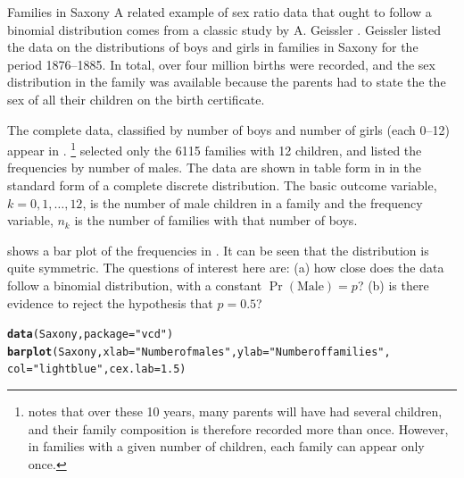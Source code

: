 \documentclass[11pt]{book}\usepackage[]{graphicx}\usepackage[]{color}
\makeatletter
\newcommand{\hlnum}[1]{\textcolor[rgb]{0.686,0.059,0.569}{#1}}%
\newcommand{\hlstr}[1]{\textcolor[rgb]{0.192,0.494,0.8}{#1}}%
\newcommand{\hlstd}[1]{\textcolor[rgb]{0.345,0.345,0.345}{#1}}%
\newcommand{\hlkwc}[1]{\textcolor[rgb]{0.333,0.667,0.333}{#1}}%
\newcommand{\hlkwd}[1]{\textcolor[rgb]{0.737,0.353,0.396}{\textbf{#1}}}%
\newenvironment{kframe}{%
 \def\at@end@of@kframe{}%
 \ifinner\ifhmode%
  \def\at@end@of@kframe{\end{minipage}}%
  \begin{minipage}{\columnwidth}%
 \fi\fi%
 \def\FrameCommand##1{\hskip\@totalleftmargin \hskip-\fboxsep
 \colorbox{shadecolor}{##1}\hskip-\fboxsep
     \hskip-\linewidth \hskip-\@totalleftmargin \hskip\columnwidth}%
 \MakeFramed {\advance\hsize-\width
   \@totalleftmargin\z@ \linewidth\hsize
   \@setminipage}}%
 {\par\unskip\endMakeFramed%
 \at@end@of@kframe}
\newenvironment{knitrout}{}{} %
\renewenvironment{knitrout}{\small\renewcommand{\baselinestretch}{.85}}{} %
\makeatother
\begin{document}
\begin{Example}[saxony1]{Families in Saxony}
A related example of sex ratio data that ought to follow a binomial distribution
comes from a classic study by A. Geissler \citeyearpar{Geissler:1889}.
Geissler listed the data on the distributions of boys and girls in families
in Saxony for the period 1876--1885. In total, over four million births were
recorded, and the sex distribution in the family was available because the parents had to state the the sex of all their children on
the birth certificate.%

The complete data, classified by number of boys and number of girls
(each 0--12) appear in \citet[Table 1]{Edwards:1958}.%
\footnote{
\citet{Edwards:1958} notes that over these 10 years, many parents
will have had several children, and their family composition 
is therefore recorded more than once.  However, in families with a given
number of children, each family can appear only once.
}
\citet[Table 6.2]{Lindsey:95} selected only the 6115 families with 
12 children, and listed the frequencies by number of males.  The
data are shown in table form in  in the standard form
of a complete discrete distribution.  The basic outcome variable, 
$k = 0, 1, \dots, 12$, is the number of male children in a family
and the frequency variable, $n_k$ is the number of families with that
number of boys.



 shows a bar plot of the frequencies in .
It can be seen that the distribution is quite symmetric.  The questions of interest
here are: 
(a) how close does the data follow a binomial distribution, with a constant
$\Pr(\mathrm{Male}) = p$?
(b) is there evidence to reject the hypothesis that $ p = 0.5$?

\begin{knitrout}
\color{fgcolor}\begin{kframe}
\begin{alltt}
\hlkwd{data}\hlstd{(Saxony,} \hlkwc{package}\hlstd{=}\hlstr{"vcd"}\hlstd{)}
\hlkwd{barplot}\hlstd{(Saxony,} \hlkwc{xlab}\hlstd{=}\hlstr{"Number of males"}\hlstd{,} \hlkwc{ylab}\hlstd{=}\hlstr{"Number of families"}\hlstd{,}
        \hlkwc{col}\hlstd{=}\hlstr{"lightblue"}\hlstd{,} \hlkwc{cex.lab}\hlstd{=}\hlnum{1.5}\hlstd{)}
\end{alltt}
\end{kframe}\begin{figure}[htbp]



\end{figure}
\end{knitrout}
\end{Example}
\end{document}
